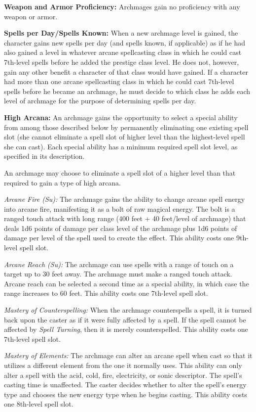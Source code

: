 \textbf{Weapon and Armor Proficiency:} Archmages gain no proficiency with any weapon 
or armor.

\textbf{Spells per Day/Spells Known:} When a new archmage level is gained, the 
character gains new spells per day (and spells known, if applicable) as if he had 
also gained a level in whatever arcane spellcasting class in which he could cast 
7th-level spells before he added the prestige class level. He does not, however, 
gain any other benefit a character of that class would have gained. If a character 
had more than one arcane spellcasting class in which he could cast 7th-level spells 
before he became an archmage, he must decide to which class he adds each level 
of archmage for the purpose of determining spells per day.

\textbf{High Arcana:} An archmage gains the opportunity to select a special ability 
from among those described below by permanently eliminating one existing spell 
slot (she cannot eliminate a spell slot of higher level than the highest-level 
spell she can cast). Each special ability has a minimum required spell slot level, 
as specified in its description.

An archmage may choose to eliminate a spell slot of a higher level than that required 
to gain a type of high arcana.

\textit{Arcane Fire (Su):} The archmage gains the ability to change arcane spell 
energy into arcane fire, manifesting it as a bolt of raw magical energy. The bolt 
is a ranged touch attack with long range (400 feet + 40 feet/level of archmage) 
that deals 1d6 points of damage per class level of the archmage plus 1d6 points 
of damage per level of the spell used to create the effect. This ability costs 
one 9th-level spell slot.

\textit{Arcane Reach (Su):} The archmage can use spells with a range of touch on 
a target up to 30 feet away. The archmage must make a ranged touch attack. Arcane 
reach can be selected a second time as a special ability, in which case the range 
increases to 60 feet. This ability costs one 7th-level spell slot.

\textit{Mastery of Counterspelling:} When the archmage counterspells a spell, it 
is turned back upon the caster as if it were fully affected by a 
spell. If the spell cannot be affected by \textit{Spell Turning}, then 
it is merely counterspelled. This ability costs one 7th-level spell slot.

\textit{Mastery of Elements:} The archmage can alter an arcane spell when cast 
so that it utilizes a different element from the one it normally uses. This ability 
can only alter a spell with the acid, cold, fire, electricity, or sonic descriptor. 
The spell's casting time is unaffected. The caster decides whether to alter the 
spell's energy type and chooses the new energy type when he begins casting. This 
ability costs one 8th-level spell slot.

